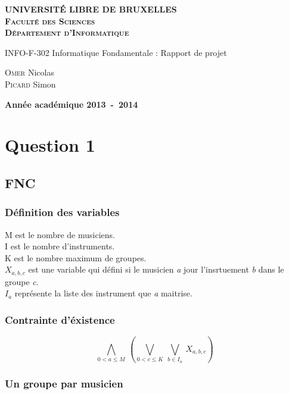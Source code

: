 \documentclass[11pt]{article}
\begin{document}
	\begin{titlepage}
	\begin{center}
	\textbf{\textsc{UNIVERSIT\'E LIBRE DE BRUXELLES}}\\
	\textbf{\textsc{Faculté des Sciences}}\\
	\textbf{\textsc{Département d'Informatique}}
	\vfill{}\vfill{}
	\begin{center}{\Huge INFO-F-302 Informatique Fondamentale : Rapport de projet}\end{center}{\Huge \par}
	\begin{center}{\large \textsc{Omer} Nicolas \\\textsc{Picard} Simon}\end{center}{\Huge \par}
	\vfill{}\vfill{}
	\vfill{}\vfill{}\enlargethispage{3cm}
	\textbf{Année académique 2013~-~2014}
	\end{center}
	
	\end{titlepage}
	
    \pagebreak

\section{Question 1}
\subsection{FNC}
\subsubsection{Définition des variables}
M est le nombre de musiciens.\\
I est le nombre d'instruments.\\
K est le nombre maximum de groupes.\\
$X_{a,b,c}$ est une variable qui défini si le musicien \textit{a} jour l'insrtuement \textit{b} dans le groupe \textit{c}.\\
$I_a$ représente la liste des instrument que \textit{a} maitrise.
\subsubsection{Contrainte d'éxistence}


$$\bigwedge\limits_{0<a\le M}\ \left(\bigvee\limits_{0<c\le K}\ \bigvee\limits_{b\in I_a}\ X_{a,b,c}\right)$$

\subsubsection{Un groupe par musicien}
\end{document}
